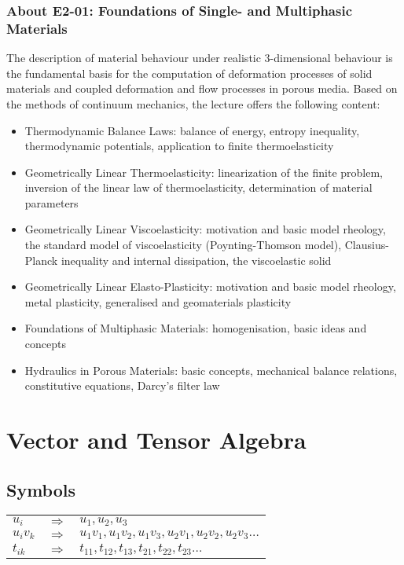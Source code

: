\documentclass[a5paper,twosided,11pt,DIV=15,BCOR=0mm]{scrbook}
\begin{document}
{\subsection*{About E2-01: Foundations of Single- and Multiphasic Materials}
The description of material behaviour under realistic 3-dimensional behaviour is
the fundamental basis for the computation of deformation processes of solid
materials and coupled deformation and flow processes in porous media. Based on
the methods of continuum mechanics, the lecture offers the following content:
%
\begin{itemize}
\item Thermodynamic Balance Laws: balance of energy, entropy inequality,
  thermodynamic potentials, application to finite thermoelasticity
\item Geometrically Linear Thermoelasticity: linearization of the finite
  problem, inversion of the linear law of thermoelasticity, determination of
  material parameters
\item Geometrically Linear Viscoelasticity: motivation and basic model rheology,
  the standard model of viscoelasticity (Poynting-Thomson model),
  Clausius-Planck inequality and internal dissipation, the viscoelastic solid
\item Geometrically Linear Elasto-Plasticity: motivation and basic model
  rheology, metal plasticity, generalised and geomaterials plasticity
\item Foundations of Multiphasic Materials: homogenisation, basic ideas and
  concepts
\item Hydraulics in Porous Materials: basic concepts, mechanical balance
  relations, constitutive equations, Darcy’s filter law
\end{itemize}
}
\chapter{Vector and Tensor Algebra}
\section{Symbols}
\begin{tabular}{@{}lll@{}}
$u_i$ & $\Rightarrow$ & $u_1, u_2, u_3$ \\
$u_iv_k$ & $\Rightarrow$ & $u_1v_1, u_1v_2, u_1v_3, u_2v_1, u_2v_2, u_2v_3 \ldots$ \\
$t_{ik}$ & $\Rightarrow$ & $t_{11}, t_{12}, t_{13}, t_{21}, t_{22}, t_{23} \ldots$ \\
\end{tabular}
%
\end{document}
